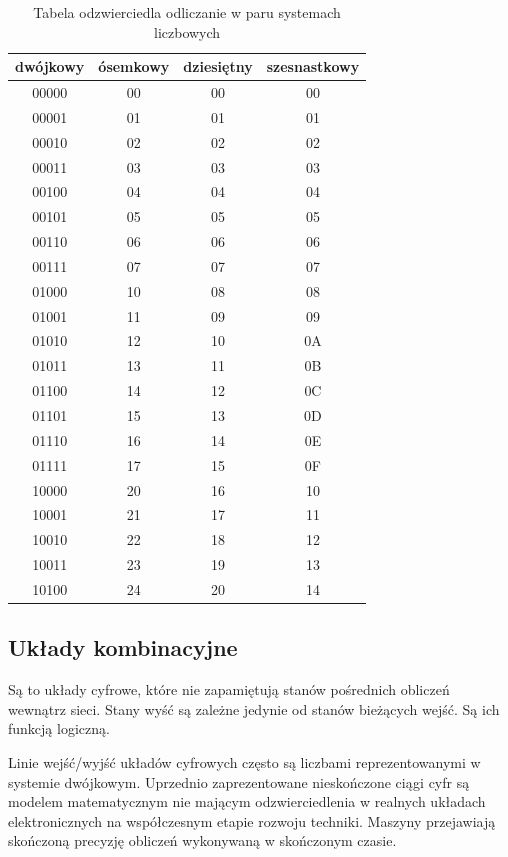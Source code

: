 \documentclass[a4paper,12pt]{article}
\begin{document}
\begin{table}[h!]
\centering
\begin{tabular}{ | c | c | c | c |}
  \hline
  dwójkowy & ósemkowy & dziesiętny & szesnastkowy \\ \hline
  00000 & 00 & 00 & 00 \\
  00001 & 01 & 01 & 01 \\
  00010 & 02 & 02 & 02 \\
  00011 & 03 & 03 & 03 \\
  00100 & 04 & 04 & 04 \\
  00101 & 05 & 05 & 05 \\
  00110 & 06 & 06 & 06 \\
  00111 & 07 & 07 & 07 \\
  01000 & 10 & 08 & 08 \\
  01001 & 11 & 09 & 09 \\
  01010 & 12 & 10 & 0A \\
  01011 & 13 & 11 & 0B \\
  01100 & 14 & 12 & 0C \\
  01101 & 15 & 13 & 0D \\
  01110 & 16 & 14 & 0E \\
  01111 & 17 & 15 & 0F \\
  10000 & 20 & 16 & 10 \\
  10001 & 21 & 17 & 11 \\
  10010 & 22 & 18 & 12 \\
  10011 & 23 & 19 & 13 \\
  10100 & 24 & 20 & 14 \\
  \hline
\end{tabular}
\caption*{Tabela odzwierciedla odliczanie w paru systemach liczbowych}
\end{table}


\subsection{Układy kombinacyjne}

Są to układy cyfrowe, które nie zapamiętują stanów pośrednich obliczeń wewnątrz sieci. Stany wyść są zależne jedynie od stanów bieżących wejść. Są ich funkcją logiczną.

Linie wejść/wyjść układów cyfrowych często są liczbami reprezentowanymi w systemie dwójkowym. Uprzednio zaprezentowane nieskończone ciągi cyfr są modelem matematycznym nie mającym odzwierciedlenia w realnych układach elektronicznych na współczesnym etapie rozwoju techniki. Maszyny przejawiają skończoną precyzję obliczeń wykonywaną w skończonym czasie.
\end{document}
